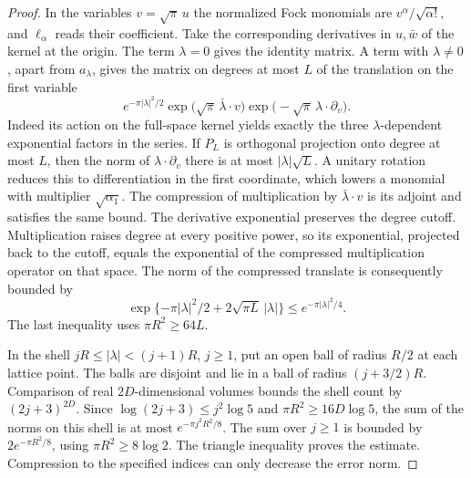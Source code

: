 \documentclass[a4paper,11pt]{article}
\theoremstyle{definition}
\theoremstyle{remark}
\numberwithin{equation}{section}
\begin{document}
\begin{proof}
In the variables \(v=\sqrt{\pi}\,u\) the normalized Fock
monomials are \(v^\alpha/\sqrt{\alpha!}\), and \(\ell_\alpha\)
reads their coefficient. Take the corresponding derivatives
in \(u,\bar w\) of the kernel at the origin. The term
\(\lambda=0\) gives the identity matrix. A term with
\(\lambda\ne0\), apart from \(a_\lambda\), gives the matrix on
degrees at most \(L\) of the translation on the first variable
\[
 e^{-\pi|\lambda|^2/2}
 \exp\bigl(\sqrt{\pi}\,\bar\lambda\cdot v\bigr)
 \exp\bigl(-\sqrt{\pi}\,\lambda\cdot\partial_v\bigr).
\]
Indeed its action on the full-space kernel yields exactly the
three \(\lambda\)-dependent exponential factors in the series.
If \(P_L\) is orthogonal projection onto degree at most \(L\),
then the norm of \(\lambda\cdot\partial_v\) there is at most
\(|\lambda|\sqrt L\). A unitary rotation reduces this to
differentiation in the first coordinate, which lowers a monomial
with multiplier \(\sqrt{\alpha_1}\). The compression of
multiplication by \(\bar\lambda\cdot v\) is its adjoint and
satisfies the same bound. The derivative exponential preserves the
degree cutoff. Multiplication raises degree at every positive
power, so its exponential, projected back to the cutoff, equals
the exponential of the compressed multiplication operator on
that space. The norm of the compressed translate is consequently
bounded by
\[
        \exp\{-\pi|\lambda|^2/2+2\sqrt{\pi L}\,|\lambda|\}
                    \le e^{-\pi|\lambda|^2/4}.
\]
The last inequality uses \(\pi R^2\ge64L\).

In the shell \(jR\le|\lambda|<(j+1)R\), \(j\ge1\), put an
open ball of radius \(R/2\) at each lattice point. The balls
are disjoint and lie in a ball of radius \((j+3/2)R\).
Comparison of real \(2D\)-dimensional volumes bounds the shell
count by \((2j+3)^{2D}\). Since
\(\log(2j+3)\le j^2\log5\) and \(\pi R^2\ge16D\log5\),
the sum of the norms on this shell is at most
\(e^{-\pi j^2R^2/8}\). The sum over \(j\ge1\) is bounded by
\(2e^{-\pi R^2/8}\), using \(\pi R^2\ge8\log2\).
The triangle inequality proves the estimate. Compression to
the specified indices can only decrease the error norm.
\end{proof}
\end{document}
